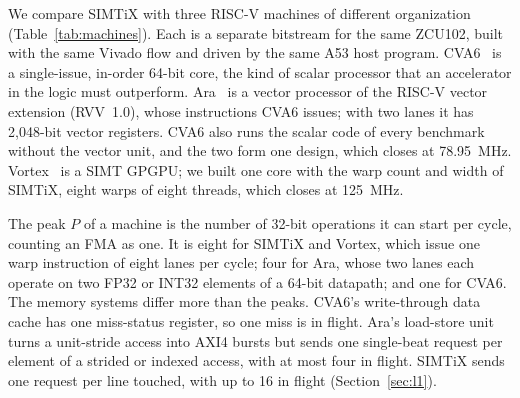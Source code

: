 \documentclass[journal]{IEEEtran}
\begin{document}
We compare SIMTiX with three RISC-V machines of different organization
(Table~\ref{tab:machines}). Each is a separate bitstream for the same ZCU102, built with
the same Vivado flow and driven by the same A53 host program. CVA6~\cite{cva6} is a
single-issue, in-order 64-bit core, the kind of scalar processor that an accelerator in
the logic must outperform. Ara~\cite{ara,ara2} is a vector processor of the RISC-V
vector extension (RVV~1.0), whose instructions CVA6 issues; with two lanes it has
2,048-bit vector registers. CVA6 also runs the scalar code of every benchmark without
the vector unit, and the two form one design, which closes at 78.95~MHz.
Vortex~\cite{vortex} is a SIMT GPGPU; we built one core with the warp count and width
of SIMTiX, eight warps of eight threads, which closes at 125~MHz.

The peak $P$ of a machine is the number of 32-bit operations it can start per cycle,
counting an FMA as one. It is eight for SIMTiX and Vortex, which issue one warp
instruction of eight lanes per cycle; four for Ara, whose two lanes each operate on
two FP32 or INT32 elements of a 64-bit datapath; and one for CVA6. The memory systems
differ more than the peaks. CVA6's write-through data cache has one miss-status
register, so one miss is in flight. Ara's load-store unit turns a unit-stride access
into AXI4 bursts but sends one single-beat request per element of a strided or indexed
access, with at most four in flight. SIMTiX sends one request per line touched, with
up to 16 in flight (Section~\ref{sec:l1}).
\end{document}
